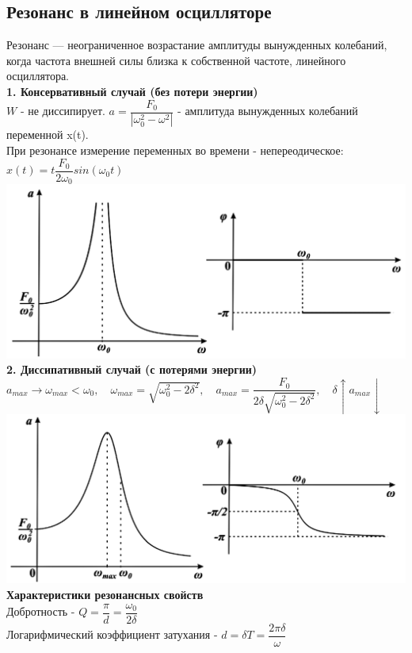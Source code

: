 \begin{multicols*}{2}
		\section{Резонанс в линейном осцилляторе}
		Резонанс — неограниченное возрастание амплитуды вынужденных колебаний, когда частота внешней силы близка к собственной частоте, линейного осциллятора.\\
		\textbf{1. Консервативный случай (без потери энергии)}\\
		$W$ - не диссипирует. $a = \dfrac{F_0}{\left\lvert \omega_0^2 - \omega^2\right\rvert }$ - амплитуда вынужденных колебаний переменной x(t).\\
		При резонансе измерение переменных во времени - непереодическое: $x(t) = t\dfrac{F_0}{2\omega_0}sin(\omega_0 t)$\\
		\includegraphics[width=0.6\linewidth]{tk_img/rezonans_1.png}\\
		\textbf{2. Диссипативный случай (с потерями энергии)}\\
		$a_{max}\to \omega_{max}<\omega_0, \quad \omega_{max} = \sqrt{\omega_0^2 - 2\delta^2}, \quad a_{max} = \dfrac{F_0}{2\delta \sqrt{\omega_0^2 - 2\delta^2}}, \quad \delta \uparrow a_{max} \downarrow $\\
		\includegraphics[width=0.6\linewidth]{tk_img/rezonans_2.png}\\
		\textbf{Характеристики резонансных свойств}\\
		Добротность - $Q = \dfrac{\pi}{d} = \dfrac{\omega_0}{2\delta}$\\
		Логарифмический коэффициент затухания - $d = \delta T = \dfrac{2\pi \delta }{\omega}$
		

\end{multicols*}
